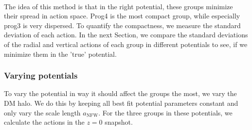 \\The idea of this method is that in the right potential, these groups minimize their spread in action space. Prog4 is the most compact group, while especially prog3 is very dispersed. To quantify the compactness, we measure the standard deviation of each action. In the next Section, we compare the standard deviations of the radial and vertical actions of each group in different potentials to see, if we minimize them in the 'true' potential.

\subsubsection{Varying potentials}\label{subsubsec:GCs_actions_varying_pot}
To vary the potential in way it should affect the groups the most, we vary the \ac{DM} halo. We do this by keeping all best fit potential parameters constant and only vary the scale length $a_\mathrm{NFW}$. For the three groups in these potentials, we calculate the actions in the $z=0$ snapshot.
